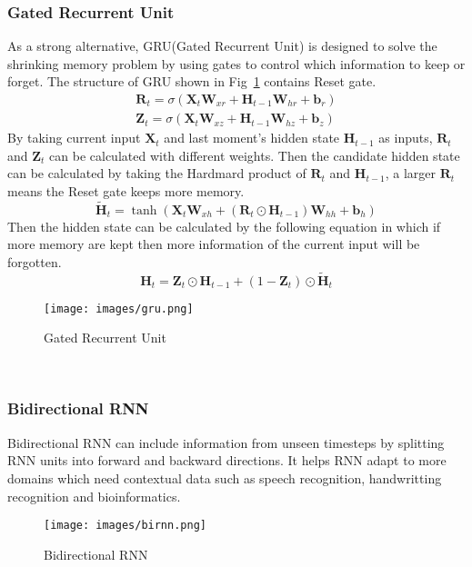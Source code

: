 \documentclass[a4paper, 11pt]{report}
\begin{document}
\subsubsection{Gated Recurrent Unit}
As a strong alternative, GRU(Gated Recurrent Unit) is designed to solve the shrinking memory problem by using gates to control which information to keep or forget. The structure of GRU shown in Fig~\ref{fig:gru} contains Reset gate.\\
$$
\begin{array}{l}{\mathbf{R}_{t}=\sigma\left(\mathbf{X}_{t} \mathbf{W}_{x r}+\mathbf{H}_{t-1} \mathbf{W}_{h r}+\mathbf{b}_{r}\right)} \\ {\mathbf{Z}_{t}=\sigma\left(\mathbf{X}_{t} \mathbf{W}_{x z}+\mathbf{H}_{t-1} \mathbf{W}_{h z}+\mathbf{b}_{z}\right)}\end{array}
$$
By taking current input $\mathbf{X}_{t}$ and last moment's hidden state $\mathbf{H}_{t-1}$ as inputs, $\mathbf{R}_{t}$ and $\mathbf{Z}_{t}$ can be calculated with different weights. Then the candidate hidden state can be calculated by taking the Hardmard product of $\mathbf{R}_{t}$ and $\mathbf{H}_{t-1}$, a larger $\mathbf{R}_{t}$ means the Reset gate keeps more memory.
$$
\tilde{\mathbf{H}}_{t}=\tanh \left(\mathbf{X}_{t} \mathbf{W}_{x h}+\left(\mathbf{R}_{t} \odot \mathbf{H}_{t-1}\right) \mathbf{W}_{h h}+\mathbf{b}_{h}\right)
$$
Then the hidden state can be calculated by the following equation in which if more memory are kept then more information of the current input will be forgotten.
$$\boldsymbol{H}_{t}=\mathbf{Z}_{t} \odot \boldsymbol{H}_{t-1}+\left(1-\mathbf{Z}_{t}\right) \odot \tilde{\boldsymbol{H}}_{t}$$
\begin{figure}[h]
 	\caption{Gated Recurrent Unit}
 	\centering
 	\texttt{[image: images/gru.png]}
 	\label{fig:gru}
 \end{figure}\\
 \subsubsection{Bidirectional RNN}
Bidirectional RNN can include information from unseen timesteps by splitting RNN units into forward and backward directions. It helps RNN adapt to more domains which need contextual data such as speech recognition, handwritting recognition and bioinformatics. 
\begin{figure}[h]
 	\caption{Bidirectional RNN}
 	\centering
 	\texttt{[image: images/birnn.png]}
 	\label{fig:birnn}
 \end{figure}\\
\end{document}
